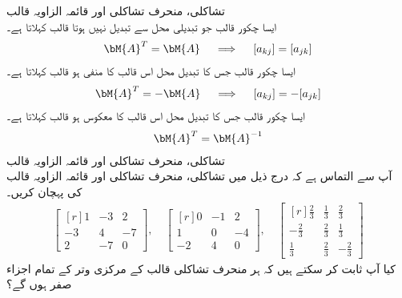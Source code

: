 \quad تشاکلی، منحرف تشاکلی اور قائمہ الزاویہ قالب\\
ایسا  چکور قالب  جو تبدیلی محل سے  تبدیل نہیں ہوتا  قالب کہلاتا ہے۔
\begin{align}\label{مساوات_آئگنی_تشاکل_منحرف_تشاکل_قائمہ_الف}
\bM{A}^T=\bM{A} \quad \implies \quad [a_{kj}]=[a_{jk}]
\end{align}
ایسا  چکور قالب  جس کا تبدیل محل اس قالب کا منفی  ہو  قالب کہلاتا ہے۔
\begin{align}\label{مساوات_آئگنی_تشاکل_منحرف_تشاکل_قائمہ_ب}
\bM{A}^T=-\bM{A}\quad \implies \quad [a_{kj}]=-[a_{jk}]
\end{align}
ایسا  چکور قالب  جس کا تبدیل محل اس  قالب کا معکوس ہو   قالب کہلاتا ہے۔
\begin{align}\label{مساوات_آئگنی_تشاکل_منحرف_تشاکل_قائمہ_پ}
\bM{A}^T=\bM{A}^{-1}
\end{align}
\quad تشاکلی، منحرف تشاکلی اور قائمہ الزاویہ قالب\\
آپ سے التماس ہے کہ درج ذیل میں تشاکلی، منحرف تشاکلی اور قائمہ الزاویہ قالب کی پہچان کریں۔
\begin{align*}
\begin{bmatrix*}[r] 1&-3&2\\-3&4&-7\\2&-7&0 \end{bmatrix*},\quad \begin{bmatrix*}[r] 0&-1&2\\1&0&-4\\-2&4&0 \end{bmatrix*},\quad
\begin{bmatrix*}[r] \tfrac{2}{3}&\tfrac{1}{3}&\tfrac{2}{3}\\-\tfrac{2}{3}&\tfrac{2}{3}&\tfrac{1}{3}\\ \tfrac{1}{3}&\tfrac{2}{3}&-\tfrac{2}{3} \end{bmatrix*}
\end{align*}
کیا آپ ثابت کر سکتے ہیں کہ ہر منحرف تشاکلی قالب کے مرکزی وتر کے تمام اجزاء صفر ہوں گے؟

